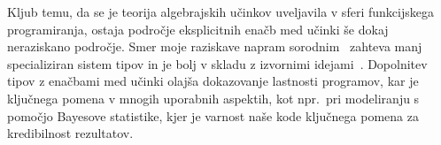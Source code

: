 \documentclass{article}
\begin{document}
Kljub temu, da se je teorija algebrajskih učinkov uveljavila v sferi funkcijskega programiranja, ostaja področje eksplicitnih enačb med učinki še dokaj neraziskano področje. Smer moje raziskave napram sorodnim~\cite{DBLP:journals/pacmpl/Ahman18} zahteva manj specializiran sistem tipov in je bolj v skladu z izvornimi idejami~\cite{DBLP:conf/esop/PlotkinP09}. Dopolnitev tipov z enačbami med učinki olajša dokazovanje lastnosti programov, kar je ključnega pomena v mnogih uporabnih aspektih, kot npr.\ pri  modeliranju s pomočjo Bayesove statistike, kjer je varnost naše kode ključnega pomena za kredibilnost rezultatov.

\renewcommand\refname{Literatura}


\end{document}

